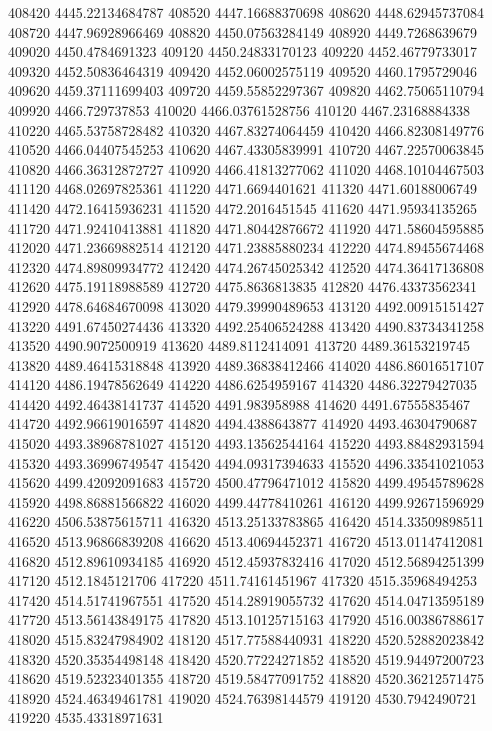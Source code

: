 {408420 4445.22134684787
408520 4447.16688370698
408620 4448.62945737084
408720 4447.96928966469
408820 4450.07563284149
408920 4449.7268639679
409020 4450.4784691323
409120 4450.24833170123
409220 4452.46779733017
409320 4452.50836464319
409420 4452.06002575119
409520 4460.1795729046
409620 4459.37111699403
409720 4459.55852297367
409820 4462.75065110794
409920 4466.729737853
410020 4466.03761528756
410120 4467.23168884338
410220 4465.53758728482
410320 4467.83274064459
410420 4466.82308149776
410520 4466.04407545253
410620 4467.43305839991
410720 4467.22570063845
410820 4466.36312872727
410920 4466.41813277062
411020 4468.10104467503
411120 4468.02697825361
411220 4471.6694401621
411320 4471.60188006749
411420 4472.16415936231
411520 4472.2016451545
411620 4471.95934135265
411720 4471.92410413881
411820 4471.80442876672
411920 4471.58604595885
412020 4471.23669882514
412120 4471.23885880234
412220 4474.89455674468
412320 4474.89809934772
412420 4474.26745025342
412520 4474.36417136808
412620 4475.19118988589
412720 4475.8636813835
412820 4476.43373562341
412920 4478.64684670098
413020 4479.39990489653
413120 4492.00915151427
413220 4491.67450274436
413320 4492.25406524288
413420 4490.83734341258
413520 4490.9072500919
413620 4489.8112414091
413720 4489.36153219745
413820 4489.46415318848
413920 4489.36838412466
414020 4486.86016517107
414120 4486.19478562649
414220 4486.6254959167
414320 4486.32279427035
414420 4492.46438141737
414520 4491.983958988
414620 4491.67555835467
414720 4492.96619016597
414820 4494.4388643877
414920 4493.46304790687
415020 4493.38968781027
415120 4493.13562544164
415220 4493.88482931594
415320 4493.36996749547
415420 4494.09317394633
415520 4496.33541021053
415620 4499.42092091683
415720 4500.47796471012
415820 4499.49545789628
415920 4498.86881566822
416020 4499.44778410261
416120 4499.92671596929
416220 4506.53875615711
416320 4513.25133783865
416420 4514.33509898511
416520 4513.96866839208
416620 4513.40694452371
416720 4513.01147412081
416820 4512.89610934185
416920 4512.45937832416
417020 4512.56894251399
417120 4512.1845121706
417220 4511.74161451967
417320 4515.35968494253
417420 4514.51741967551
417520 4514.28919055732
417620 4514.04713595189
417720 4513.56143849175
417820 4513.10125715163
417920 4516.00386788617
418020 4515.83247984902
418120 4517.77588440931
418220 4520.52882023842
418320 4520.35354498148
418420 4520.77224271852
418520 4519.94497200723
418620 4519.52323401355
418720 4519.58477091752
418820 4520.36212571475
418920 4524.46349461781
419020 4524.76398144579
419120 4530.7942490721
419220 4535.43318971631
}

